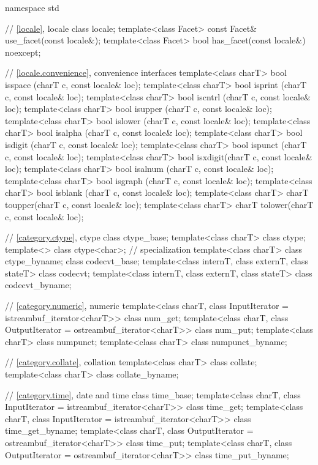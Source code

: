 %
\begin{codeblock}
namespace std {
  // \ref{locale}, locale
  class locale;
  template<class Facet> const Facet& use_facet(const locale&);
  template<class Facet> bool         has_facet(const locale&) noexcept;

  // \ref{locale.convenience}, convenience interfaces
  template<class charT> bool isspace (charT c, const locale& loc);
  template<class charT> bool isprint (charT c, const locale& loc);
  template<class charT> bool iscntrl (charT c, const locale& loc);
  template<class charT> bool isupper (charT c, const locale& loc);
  template<class charT> bool islower (charT c, const locale& loc);
  template<class charT> bool isalpha (charT c, const locale& loc);
  template<class charT> bool isdigit (charT c, const locale& loc);
  template<class charT> bool ispunct (charT c, const locale& loc);
  template<class charT> bool isxdigit(charT c, const locale& loc);
  template<class charT> bool isalnum (charT c, const locale& loc);
  template<class charT> bool isgraph (charT c, const locale& loc);
  template<class charT> bool isblank (charT c, const locale& loc);
  template<class charT> charT toupper(charT c, const locale& loc);
  template<class charT> charT tolower(charT c, const locale& loc);

  // \ref{category.ctype}, ctype
  class ctype_base;
  template<class charT> class ctype;
  template<>            class ctype<char>;      // specialization
  template<class charT> class ctype_byname;
  class codecvt_base;
  template<class internT, class externT, class stateT> class codecvt;
  template<class internT, class externT, class stateT> class codecvt_byname;

  // \ref{category.numeric}, numeric
  template<class charT, class InputIterator = istreambuf_iterator<charT>>
    class num_get;
  template<class charT, class OutputIterator = ostreambuf_iterator<charT>>
    class num_put;
  template<class charT>
    class numpunct;
  template<class charT>
    class numpunct_byname;

  // \ref{category.collate}, collation
  template<class charT> class collate;
  template<class charT> class collate_byname;

  // \ref{category.time}, date and time
  class time_base;
  template<class charT, class InputIterator = istreambuf_iterator<charT>>
    class time_get;
  template<class charT, class InputIterator = istreambuf_iterator<charT>>
    class time_get_byname;
  template<class charT, class OutputIterator = ostreambuf_iterator<charT>>
    class time_put;
  template<class charT, class OutputIterator = ostreambuf_iterator<charT>>
    class time_put_byname;

}
\end{codeblock}

